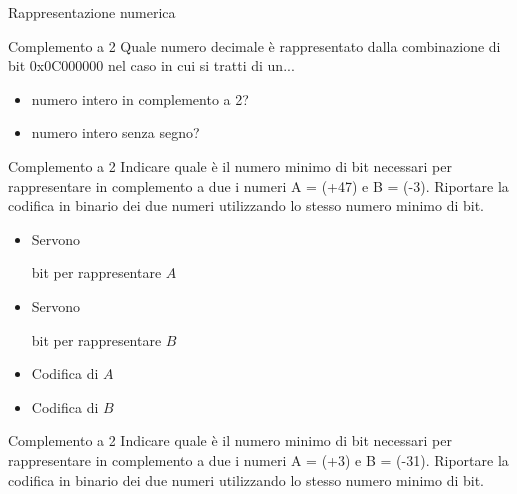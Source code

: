\documentclass[11pt]{article}
\begin{document}
\begin{quiz}{Rappresentazione numerica}
\begin{cloze}[points=1,shuffle=false]{Complemento a 2}
Quale numero decimale è rappresentato dalla combinazione di bit 0x0C000000 nel caso in cui si tratti di un...
\begin{itemize}
\item numero intero in complemento a 2? 
\item numero intero senza segno? 
\end{itemize}
\end{cloze}


\begin{cloze}[points=1,shuffle=false]{Complemento a 2}
Indicare quale \`{e} il numero minimo di bit necessari per rappresentare in complemento a due i numeri A = (+47) e B = (-3). Riportare la codifica in binario dei due numeri utilizzando lo stesso numero minimo di bit.

\begin{itemize}
\item Servono  bit per rappresentare $A$
\item Servono  bit per rappresentare $B$
\item Codifica di $A$ 
\item Codifica di $B$ 
\end{itemize}
\end{cloze}

\begin{cloze}[points=1,shuffle=false]{Complemento a 2}
Indicare quale \`{e} il numero minimo di bit necessari per rappresentare in complemento a due i numeri A = (+3) e B = (-31). Riportare la codifica in binario dei due numeri utilizzando lo stesso numero minimo di bit.


\end{cloze}
\end{quiz}
\end{document}

